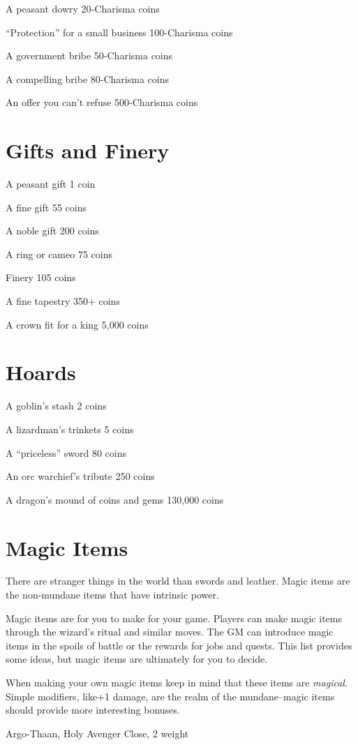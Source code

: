  A peasant dowry 20-Charisma coins


 ``Protection'' for a small business 100-Charisma coins


 A government bribe 50-Charisma coins


 A compelling bribe 80-Charisma coins


 An offer you can't refuse 500-Charisma coins
\section*{Gifts and Finery}


 A peasant gift 1 coin


 A fine gift 55 coins


 A noble gift 200 coins


 A ring or cameo 75 coins


 Finery 105 coins


 A fine tapestry 350+ coins


 A crown fit for a king 5,000 coins
\section*{Hoards}


 A goblin's stash 2 coins


 A lizardman's trinkets 5 coins


 A ``priceless'' sword 80 coins


 An orc warchief's tribute 250 coins


 A dragon's mound of coins and gems 130,000 coins
\section*{Magic Items}


 There are stranger things in the world than swords and leather. Magic items are the non-mundane items that have intrinsic power.


 Magic items are for you to make for your game. Players can make magic items through the wizard's ritual and similar moves. The GM can introduce magic items in the spoils of battle or the rewards for jobs and quests. This list provides some ideas, but magic items are ultimately for you to decide.


 When making your own magic items keep in mind that these items are \emph{magical}. Simple modifiers, like+1 damage, are the realm of the mundane--magic items should provide more interesting bonuses.


 Argo-Thaan, Holy Avenger Close, 2 weight


